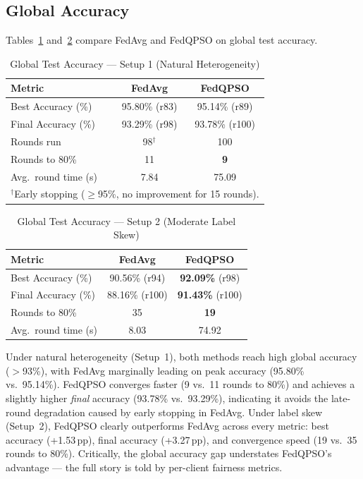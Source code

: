 \documentclass[conference]{IEEEtran}
\begin{document}
\subsection{Global Accuracy}

Tables~\ref{tab:global_s1} and~\ref{tab:global_s2} compare FedAvg and
FedQPSO on global test accuracy.

\begin{table}[htbp]
\caption{Global Test Accuracy --- Setup 1 (Natural Heterogeneity)}
\label{tab:global_s1}
\begin{center}
\begin{tabular}{lcc}
\hline
\textbf{Metric} & \textbf{FedAvg} & \textbf{FedQPSO}\\
\hline
Best Accuracy (\%)    & 95.80\% (r83) & 95.14\% (r89)\\
Final Accuracy (\%)   & 93.29\% (r98) & 93.78\% (r100)\\
Rounds run            & 98$^\dagger$  & 100\\
Rounds to 80\%        & 11            & \textbf{9}\\
Avg.\ round time (s)  & 7.84          & 75.09\\
\hline
\multicolumn{3}{l}{\small $^\dagger$Early stopping ($\geq$95\%,
no improvement for 15 rounds).}
\end{tabular}
\end{center}
\end{table}

\begin{table}[htbp]
\caption{Global Test Accuracy --- Setup 2 (Moderate Label Skew)}
\label{tab:global_s2}
\begin{center}
\begin{tabular}{lcc}
\hline
\textbf{Metric} & \textbf{FedAvg} & \textbf{FedQPSO}\\
\hline
Best Accuracy (\%)    & 90.56\% (r94)  & \textbf{92.09\%} (r98)\\
Final Accuracy (\%)   & 88.16\% (r100) & \textbf{91.43\%} (r100)\\
Rounds to 80\%        & 35             & \textbf{19}\\
Avg.\ round time (s)  & 8.03           & 74.92\\
\hline
\end{tabular}
\end{center}
\end{table}

Under natural heterogeneity (Setup~1), both methods reach high global
accuracy ($>$93\%), with FedAvg marginally leading on peak accuracy (95.80\%
vs.\ 95.14\%). FedQPSO converges faster (9 vs.\ 11 rounds to 80\%) and
achieves a slightly higher \emph{final} accuracy (93.78\% vs.\ 93.29\%),
indicating it avoids the late-round degradation caused by early stopping
in FedAvg. Under label skew (Setup~2), FedQPSO clearly outperforms FedAvg
across every metric: best accuracy (+1.53\,pp), final accuracy (+3.27\,pp),
and convergence speed (19 vs.\ 35 rounds to 80\%). Critically, the global
accuracy gap understates FedQPSO's advantage — the full story is told by
per-client fairness metrics.
\end{document}
